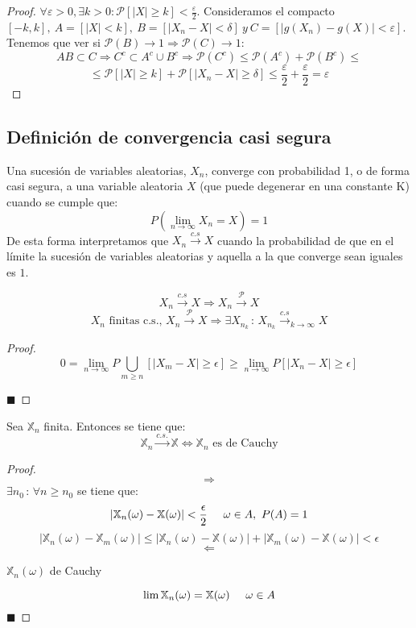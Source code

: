 \documentclass[12pt,a4paper]{book}
\newcommand*{\qed}{\hfill\ensuremath{\blacksquare}}
\begin{document}
\begin{proof}
$\forall \varepsilon > 0, \exists k>0 : \mathcal{P}[|X| \geq k] < \frac{\varepsilon}{2}$. Consideramos el compacto $[-k,k], \ A = [|X| < k], \ B = [|X_n - X| < \delta] \ y \ C = [|g(X_n) - g(X)| < \varepsilon]$. Tenemos que ver si $\mathcal{P}(B)\to 1 \Rightarrow \mathcal{P}(C)\to 1 $:
$$ AB \subset C \Rightarrow C^c \subset A^c \cup B^c \Rightarrow \mathcal{P}(C^c) \leq \mathcal{P}(A^c) + \mathcal{P}(B^c) \leq $$
$$ \leq \mathcal{P}[|X| \geq k] + \mathcal{P}[|X_n - X| \geq \delta] \leq \frac{\varepsilon}{2} + \frac{\varepsilon}{2} = \varepsilon$$
\end{proof}

\subsection{Definición de convergencia casi segura}

Una sucesión de variables aleatorias, ${ X_n }$, converge con probabilidad 1, o de forma casi segura, a una variable aleatoria $X$ (que puede degenerar en una constante K) cuando se cumple que:
$$P(\lim_{n\rightarrow\infty}X_n=X)=1$$
De esta forma interpretamos que $X_n\stackrel{c.s}{\longrightarrow}X$ cuando la probabilidad de que en el límite la sucesión de variables  aleatorias y aquella a la que converge sean iguales es $1$.

\begin{theorem}
$$X_n\stackrel{c.s}{\longrightarrow}X\Longrightarrow X_n\stackrel{\mathcal{P}}{\longrightarrow}X$$
$$X_n \text{ finitas c.s.,  }
X_n\stackrel{\mathcal{P}}{\longrightarrow}X
\Longrightarrow 
\exists X_{n_k}\,:\, X_{n_k}
\stackrel{c.s}{\longrightarrow}_{k\rightarrow\infty}X$$
\end{theorem}
\begin{proof}
$$0=\displaystyle\lim_{n\rightarrow\infty}P\bigcup_{m\geq n}[|X_m - X|\geq \epsilon ]\geq\displaystyle\lim_{n\rightarrow\infty}P[|X_n - X|\geq \epsilon ]$$

\qed
\end{proof}

\begin{lemma}
Sea $\mathbb{X}_n$ finita. Entonces se tiene que:
\\
$$\mathbb{X}_n \stackrel{c.s.}{\longrightarrow}\mathbb{X}\Longleftrightarrow \mathbb{X}_n \text{ es de Cauchy}$$
\end{lemma}
\begin{proof}
$$\Longrightarrow$$
$\exists n_0\, : \, \forall n\geq n_0$ se tiene que:
$$|\mathbb{X}_n(\omega)-\mathbb{X}(\omega)|<\frac{\epsilon}{2}
\hspace{0.5cm}  \omega \in A,\ P(A)=1$$
$$|\mathbb{X}_n(\omega)-\mathbb{X}_m(\omega)|\leq|\mathbb{X}_n(\omega)-\mathbb{X}(\omega)|+|\mathbb{X}_m(\omega)-\mathbb{X}(\omega)|<\epsilon$$
$$\Longleftarrow$$
\begin{center}
${\mathbb{X}_n(\omega)}$ de Cauchy
\end{center}
$$\lim\mathbb{X}_n(\omega)=\mathbb{X}(\omega)\hspace{0.5cm} \omega \in A$$
\qed
\end{proof}
\end{document}

